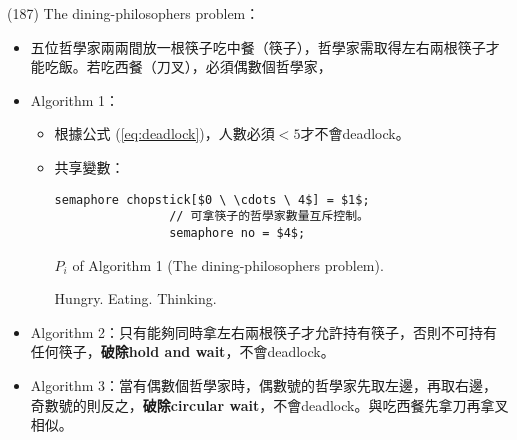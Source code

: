 \begin{theorem}{(187)} The dining-philosophers problem：\begin{itemize}
        \item 五位哲學家兩兩間放一根筷子吃中餐（筷子），哲學家需取得左右兩根筷子才能吃飯。若吃西餐（刀叉），必須偶數個哲學家，
        \item Algorithm 1：\begin{itemize}
            \item 根據公式 (\ref{eq:deadlock})，人數必須$< 5$才不會deadlock。
            \item 共享變數：\begin{lstlisting}[caption={Shared variables of The dining-philosophers problem.}, captionpos=b, mathescape=true]
                semaphore chopstick[$0 \ \cdots \ 4$] = $1$;
                // 可拿筷子的哲學家數量互斥控制。
                semaphore no = $4$; 
            \end{lstlisting}
            \begin{algorithm}[H]
                \caption{$P_i$ of Algorithm 1 (The dining-philosophers problem).}
                \begin{algorithmic}[1]
                        \Repeat
                            \State {}
                            \State Hungry.
                            \State {}
                            \State {}
                            \State Eating.
                            \State {}
                            \State {}
                            \State Thinking.
                            \State {}
                    \EndFunction
                \end{algorithmic}
            \end{algorithm}
        \end{itemize}
        \item Algorithm 2：只有能夠同時拿左右兩根筷子才允許持有筷子，否則不可持有任何筷子，\textbf{破除hold and wait}，不會deadlock。
        \item Algorithm 3：當有偶數個哲學家時，偶數號的哲學家先取左邊，再取右邊，奇數號的則反之，\textbf{破除circular wait}，不會deadlock。與吃西餐先拿刀再拿叉相似。
    \end{itemize}
\end{theorem}

